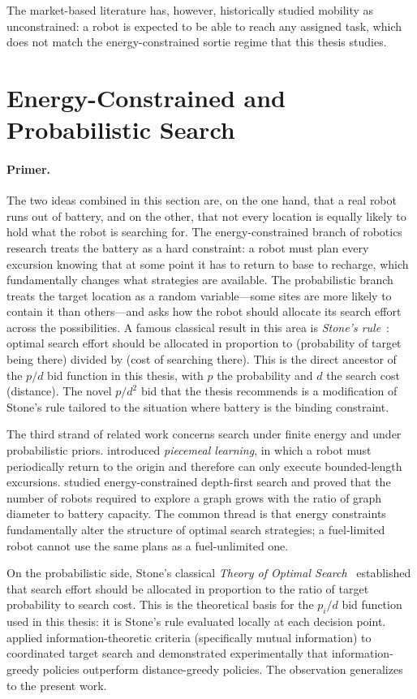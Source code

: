 \begin{doublespacing}
The market-based literature has, however, historically studied mobility
as unconstrained: a robot is expected to be able to reach any assigned
task, which does not match the energy-constrained sortie regime that
this thesis studies.

\section{Energy-Constrained and Probabilistic Search}

\paragraph{Primer.} The two ideas combined in this section are, on
the one hand, that a real robot runs out of battery, and on the
other, that not every location is equally likely to hold what the
robot is searching for. The energy-constrained branch of robotics
research treats the battery as a hard constraint: a robot must
plan every excursion knowing that at some point it has to return
to base to recharge, which fundamentally changes what strategies
are available. The probabilistic branch treats the target
location as a random variable---some sites are more likely to
contain it than others---and asks how the robot should allocate its
search effort across the possibilities. A famous classical result
in this area is \emph{Stone's rule}~\citep{Stone1975}: optimal
search effort should be allocated in proportion to (probability
of target being there) divided by (cost of searching there). This
is the direct ancestor of the $p/d$ bid function in this thesis,
with $p$ the probability and $d$ the search cost (distance). The
novel $p/d^2$ bid that the thesis recommends is a modification of
Stone's rule tailored to the situation where battery is the binding
constraint.

The third strand of related work concerns search under finite energy
and under probabilistic priors. \citet{Betke1995} introduced \emph{piecemeal learning}, in which a
robot must periodically return to the origin and therefore can only
execute bounded-length excursions. \citet{Das2017} studied
energy-constrained depth-first search
and proved that the number of robots required to explore a graph
grows with the ratio of graph diameter to battery capacity. The common
thread is that energy constraints fundamentally alter the structure of
optimal search strategies; a fuel-limited robot cannot use the same
plans as a fuel-unlimited one.

On the probabilistic side, Stone's classical \emph{Theory of Optimal
Search}~\citep{Stone1975} established that search effort should be
allocated in proportion to the ratio of target probability to search
cost. This is the theoretical basis for the $p_i / d$ bid function
used in this thesis: it is Stone's rule evaluated locally at each
decision point. \citet{Bourgault2003} applied information-theoretic
criteria (specifically mutual information) to coordinated target
search and demonstrated experimentally that information-greedy
policies outperform distance-greedy policies. The observation
generalizes to the present work.


\end{doublespacing}

